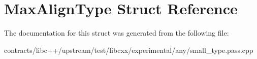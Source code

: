 \hypertarget{struct_max_align_type}{}\section{Max\+Align\+Type Struct Reference}
\label{struct_max_align_type}


The documentation for this struct was generated from the following file\+:\begin{DoxyCompactItemize}
\item 
contracts/libc++/upstream/test/libcxx/experimental/any/small\+\_\+type.\+pass.\+cpp\end{DoxyCompactItemize}
